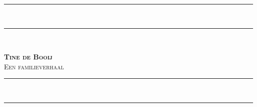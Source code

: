 {\begingroup
\iftablet
{} %
\else
{} %
\fi
\noindent
\hspace{-8mm}\parbox{12cm}{\rule{10cm}{1.6pt}\vspace*{-\baselineskip}\vspace*{2pt}\\ %
\rule{10cm}{0.4pt}\\[0.2\baselineskip] %
\parbox[c][2cm]{10cm}{\centering\textsc{\LARGE \textbf{Tine de Booij} \\ Een familieverhaal}
\par}

 \noindent\rule{10cm}{0.4pt}\vspace*{-\baselineskip}\vspace{3.2pt}\\ %
\rule{10cm}{1.6pt}}\\[\baselineskip] %
\endgroup}
\cleardoublepage

